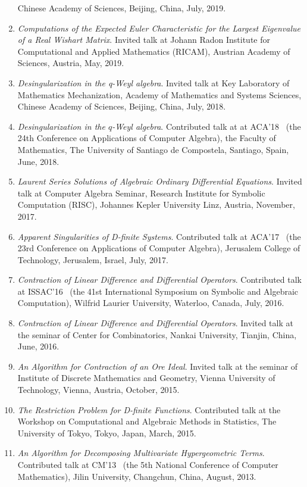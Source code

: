 \documentclass[a4paper,12pt]{article}
\begin{document}
\begin{enumerate}
 Chinese Academy of Sciences, Beijing, China, July, 2019. 
\item {\em Computations of the Expected Euler Characteristic for the Largest Eigenvalue of a Real Wishart Matrix}.
Invited talk at Johann Radon Institute for Computational and Applied Mathematics (RICAM), Austrian Academy of Sciences, 
Austria, May, 2019.
 \item {\em Desingularization in the q-Weyl algebra}. 
 Invited talk at Key Laboratory of Mathematics Mechanization, Academy of Mathematics and Systems Sciences,
 Chinese Academy of Sciences, Beijing, China, July, 2018. 
 \item {\em Desingularization in the $q$-Weyl algebra}. 
 Contributed talk at at ACA'18 
 \ (the 24th Conference on Applications of Computer Algebra), the Faculty of Mathematics, 
 The University of Santiago de Compostela, Santiago, Spain, June, 2018.
 \item {\em Laurent Series Solutions of Algebraic Ordinary Differential Equations}. 
 Invited talk at Computer Algebra Seminar, Research Institute for Symbolic Computation (RISC), Johannes Kepler University Linz, 
 Austria, November, 2017.
 \item {\em Apparent Singularities of D-finite Systems}. Contributed talk at ACA'17 
 \ (the 23rd Conference on Applications of Computer Algebra), Jerusalem College of Technology, Jerusalem, Israel, July, 2017.
 \item {\em Contraction of Linear Difference and Differential Operators}. Contributed talk at ISSAC'16 
 \ (the 41st International Symposium on Symbolic and Algebraic Computation), Wilfrid Laurier University, Waterloo, Canada, July, 2016.
 \item {\em Contraction of Linear Difference and Differential Operators}.
       Invited talk at the seminar of Center for Combinatorics, Nankai University, Tianjin, China, June, 2016.
 \item {\em An Algorithm for Contraction of an Ore Ideal}. Invited talk at the seminar of Institute of Discrete Mathematics and Geometry, 
       Vienna University of Technology, Vienna, Austria, October, 2015.
 \item {\em The Restriction Problem for D-finite Functions}. 
       Contributed talk at the Workshop on Computational and Algebraic Methods in Statistics,
       The University of Tokyo, Tokyo, Japan, March, 2015.
 \item {\em An Algorithm for Decomposing Multivariate Hypergeometric Terms}. Contributed talk at CM'13
       \ (the 5th National Conference of Computer Mathematics), Jilin University, Changchun, China, August, 2013.
\end{enumerate}
\end{document}
